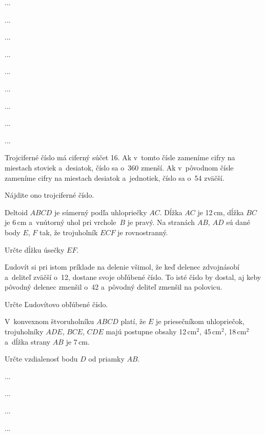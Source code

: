 {%
...}

{%
...}

{%
...}

{%
...}

{%
...}

{%
...}

{%
...}

{%
...}

{%
...}

{%
Trojciferné číslo má ciferný súčet 16.
Ak v~tomto čísle zameníme cifry na miestach stoviek a~desiatok, číslo sa o~360 zmenší.
Ak v~pôvodnom čísle zameníme cifry na miestach desiatok a~jednotiek, číslo sa o~54 zväčší.

Nájdite ono trojciferné číslo.}

{%
Deltoid $ABCD$ je súmerný podľa uhlopriečky $AC$.
Dĺžka $AC$ je 12\,cm, dĺžka $BC$ je 6\,cm a~vnútorný uhol pri vrchole~$B$ je pravý.
Na stranách $AB$, $AD$ sú dané body $E$, $F$ tak, že trojuholník $ECF$ je rovnostranný.

Určte dĺžku úsečky $EF$.
}

{%
Ľudovít si pri istom príklade na delenie všimol, že keď delenec zdvojnásobí a~deliteľ zväčší o~12, dostane svoje obľúbené číslo. To isté číslo by dostal, aj keby pôvodný delenec zmenšil o~42 a~pôvodný deliteľ zmenšil na polovicu.

Určte Ľudovítovo obľúbené číslo.
}

{%
V~konvexnom štvoruholníku $ABCD$ platí, že $E$ je priesečníkom uhlopriečok, trojuholníky $ADE$, $BCE$, $CDE$ majú postupne obsahy 12\,cm$^2$, 45\,cm$^2$, 18\,cm$^2$ a~dĺžka strany $AB$ je 7\,cm.

Určte vzdialenosť bodu $D$ od priamky $AB$.}

{%
...}

{%
...}

{%
...}

{%
...}

